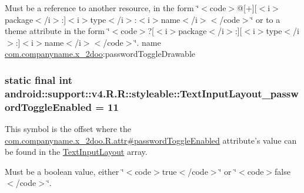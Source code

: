 Must be a reference to another resource, in the form \char`\"{}$<$code$>$@\mbox{[}+\mbox{]}\mbox{[}$<$i$>$package$<$/i$>$:\mbox{]}$<$i$>$type$<$/i$>$:$<$i$>$name$<$/i$>$$<$/code$>$\char`\"{} or to a theme attribute in the form \char`\"{}$<$code$>$?\mbox{[}$<$i$>$package$<$/i$>$:\mbox{]}\mbox{[}$<$i$>$type$<$/i$>$:\mbox{]}$<$i$>$name$<$/i$>$$<$/code$>$\char`\"{}.  name \hyperlink{namespacecom_1_1companyname_1_1x__2doo}{com.companyname.x\_\-2doo}:passwordToggleDrawable \hypertarget{classandroid_1_1support_1_1v4_1_1_r_1_1styleable_42d6b9f952af765e6e832381e786bcd8}{
\subsubsection[{TextInputLayout\_\-passwordToggleEnabled}]{\setlength{\rightskip}{0pt plus 5cm}static final int android::support::v4.R.R::styleable::TextInputLayout\_\-passwordToggleEnabled = 11}}
\label{classandroid_1_1support_1_1v4_1_1_r_1_1styleable_42d6b9f952af765e6e832381e786bcd8}


This symbol is the offset where the \hyperlink{classcom_1_1companyname_1_1x__2doo_1_1_r_1_1attr_6247e17752785ca815d31c5107e56950}{com.companyname.x\_\-2doo.R.attr\#passwordToggleEnabled} attribute's value can be found in the \hyperlink{classandroid_1_1support_1_1v4_1_1_r_1_1styleable_880beb171ce483ab1b63a82ef7f9d976}{TextInputLayout} array.

Must be a boolean value, either \char`\"{}$<$code$>$true$<$/code$>$\char`\"{} or \char`\"{}$<$code$>$false$<$/code$>$\char`\"{}. 

